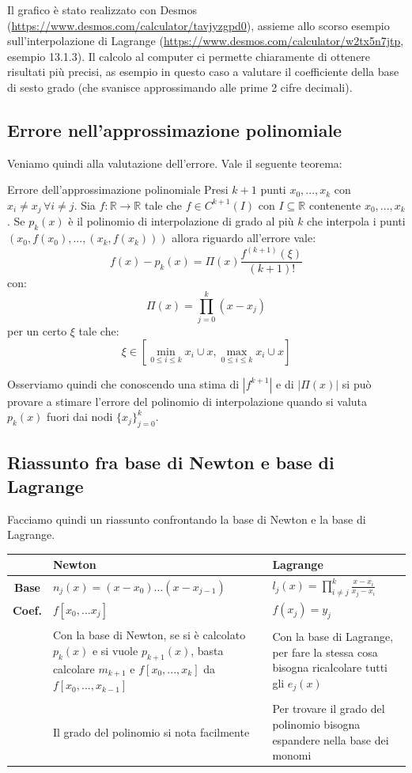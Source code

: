 \documentclass[a4paper,11pt]{article}
\begin{document}
Il grafico è stato realizzato con Desmos (\url{https://www.desmos.com/calculator/tavjyzgpd0}), assieme allo scorso esempio sull'interpolazione di Lagrange (\url{https://www.desmos.com/calculator/w2tx5n7jtp}, esempio 13.1.3).
Il calcolo al computer ci permette chiaramente di ottenere risultati più precisi, as esempio in questo caso a valutare il coefficiente della base di sesto grado (che svanisce approssimando alle prime 2 cifre decimali). 

\newpage

\subsection{Errore nell'approssimazione polinomiale}
Veniamo quindi alla valutazione dell'errore.
Vale il seguente teorema:
\begin{theorem}{Errore dell'approssimazione polinomiale}
	Presi $k + 1$ punti $x_0, ..., x_k$ con $x_i \neq x_j \, \forall i \neq j$.
	Sia $f: \mathbb{R} \rightarrow \mathbb{R}$ tale che $f \in C^{k + 1}(I)$ con $I \subseteq \mathbb{R}$ contenente $x_0, ..., x_k$.
	Se $p_k(x)$ è il polinomio di interpolazione di grado al più $k$ che interpola i punti $(x_0, f(x_0), ..., (x_k, f(x_k)))$ allora riguardo all'errore vale:
$$
f(x) - p_k(x) = \Pi(x) \frac{f^{(k + 1)}(\xi)}{(k + 1)!}
$$
con:
$$
\Pi(x) = \prod_{j = 0}^k (x - x_j)
$$
per un certo $\xi$ tale che:
$$
\xi \in \left[ \min_{0 \leq i \leq k} x_i \cup x, \max_{0 \leq i \leq k} x_i \cup x \right]
$$
\end{theorem}

Osserviamo quindi che conoscendo una stima di $|f^{k + 1}|$ e  di $|\Pi(x)|$ si può provare a stimare l'errore del polinomio di interpolazione quando si valuta $p_k(x)$ fuori dai nodi $\{ x_j \}_{j=0}^k$.

\subsection{Riassunto fra base di Newton e base di Lagrange}
Facciamo quindi un riassunto confrontando la base di Newton e la base di Lagrange.
\begin{table}[h!]
	\center 
	\begin{tabular} { c p{6cm} | p{6cm} }
		& \bfseries Newton & \bfseries Lagrange \\
		\hline
		\bfseries Base & $n_j(x) = (x - x_0) ... (x - x_{j - 1}) $ & $l_j(x) = \prod_{i \neq j}^k \frac{x - x_i}{x_j - x_i}$ \\
		\bfseries Coef. & $f[x_0, ... x_j]$ & $f(x_j) = y_j$ \\ & \\
		& Con la base di Newton, se si è calcolato $p_k(x)$ e si vuole $p_{k + 1}(x)$, basta calcolare $m_{k + 1}$ e $f[x_0, ..., x_{k}]$ da $f[x_0, ..., x_{k - 1}]$ &
		Con la base di Lagrange, per fare la stessa cosa bisogna ricalcolare tutti gli $e_j(x)$ \\ & \\
		& Il grado del polinomio si nota facilmente & Per trovare il grado del polinomio bisogna espandere nella base dei monomi
	\end{tabular}
\end{table}
\end{document}
